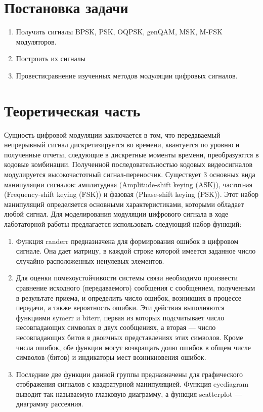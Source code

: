 \documentclass[10pt,a4paper]{report}
\begin{document}
\section{Постановка задачи}
\begin{enumerate}
\item 
Получить сигналы BPSK, PSK, OQPSK, genQAM, MSK, M-FSK модуляторов.
\item
Построить их сигналы
\item
Провестисравнение изученных методов модуляции цифровых сигналов.
\end{enumerate}
\section{Теоретическая часть}
Сущность цифровой модуляции заключается в том, что передаваемый непрерывный сигнал дискретизируется во времени, квантуется по уровню и полученные отчеты, следующие в дискретные моменты времени, преобразуются в кодовые комбинации. Полученной последовательностью кодовых видеосигналов модулируется высокочастотный сигнал-переносчик.
Существует 3 основных вида манипуляции сигналов: амплитудная (Amplitude-shift keying (ASK)), частотная (Frequency-shift keying (FSK)) и фазовая (Phase-shift keying (PSK)). Этот набор манипуляций определяется основными характеристиками, которыми обладает любой сигнал. Для моделирования модуляции цифрового сигнала в ходе лаботаторной работы предлагается использовать следующий набор функций:
\begin{enumerate}
\item Функция randerr предназначена для формирования ошибок в цифровом сигнале. Она дает матрицу, в каждой строке которой имеется заданное число случайно расположенных ненулевых элементов.
\item Для оценки помехоустойчивости системы связи необходимо произвести сравнение исходного (передаваемого) сообщения с сообщением, полученным в результате приема, и определить число ошибок, возникших в процессе передачи, а также вероятность ошибки. Эти действия выполняются функциями symerr и biterr, первая из которых подсчитывает число несовпадающих символах в двух сообщениях, а вторая — число несовпадающих битов в двоичных представлениях этих символов. Кроме числа ошибок, обе функции могут возвращать долю ошибок в общем числе символов (битов) и индикаторы мест возникновения ошибок.
\item Последние две функции данной группы предназначены для графического отображения сигналов с квадратурной манипуляцией. Функция eyediagram выводит так называемую глазковую диаграмму, а функция scatterplot — диаграмму рассеяния.
\end{enumerate}
\end{document}
